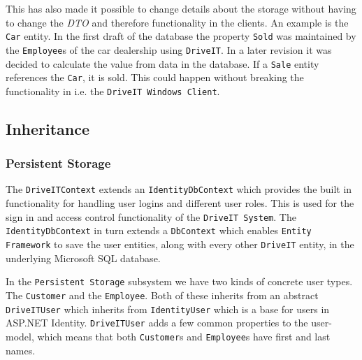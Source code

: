 This has also made it possible to change details about the storage without having to change the \textit{DTO} and therefore functionality in the clients. An example is the \texttt{Car} entity. In the first draft of the database the property \texttt{Sold} was maintained by the \texttt{Employee}s of the car dealership using \texttt{DriveIT}. In a later revision it was decided to calculate the value from data in the database. If a \texttt{Sale} entity references the \texttt{Car}, it is sold. This could happen without breaking the functionality in i.e. the \texttt{DriveIT Windows Client}.

\subsection{Inheritance}
\subsubsection{Persistent Storage}
The \texttt{DriveITContext} extends an \texttt{IdentityDbContext} which provides the built in functionality for handling user logins and different user roles. This is used for the sign in and access control functionality of the \texttt{DriveIT System}.
The \texttt{IdentityDbContext} in turn extends a \texttt{DbContext} which enables \texttt{Entity Framework} to save the user entities, along with every other \texttt{DriveIT} entity, in the underlying Microsoft SQL database.

In the \texttt{Persistent Storage} subsystem we have two kinds of concrete user types. The \texttt{Customer} and the \texttt{Employee}. Both of these inherits from an abstract \texttt{DriveITUser} which inherits from \texttt{IdentityUser} which is a base for users in ASP.NET Identity. \texttt{DriveITUser} adds a few common properties to the user-model, which means that both \texttt{Customer}s and \texttt{Employee}s have first and last names.
